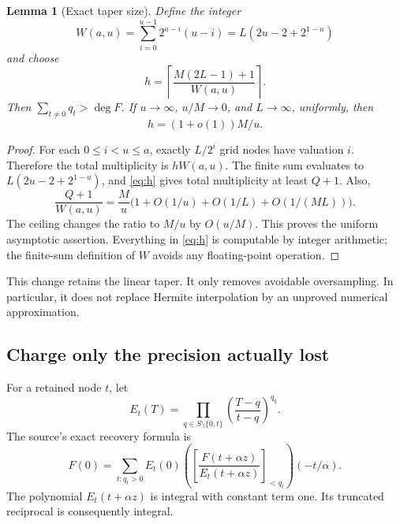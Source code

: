 \documentclass[11pt]{article}
\newtheorem{lemma}[theorem]{Lemma}
\theoremstyle{remark}
\begin{document}
\begin{lemma}[Exact taper size]
\label{lem:taper}
Define the integer
\[
 W(a,u)=\sum_{i=0}^{u-1}2^{a-i}(u-i)
       =L(2u-2+2^{1-u})
\]
and choose
\begin{equation}
 h=\left\lceil\frac{M(2L-1)+1}{W(a,u)}\right\rceil.
 \label{eq:h}
\end{equation}
Then $\sum_{t\ne0}q_t>\deg F$. If $u\to\infty$, $u/M\to0$, and $L\to\infty$, uniformly, then
\[
 h=(1+o(1))M/u.
\]
\end{lemma}
\begin{proof}
For each $0\le i<u\le a$, exactly $L/2^i$ grid nodes have valuation $i$. Therefore the total multiplicity is $hW(a,u)$. The finite sum evaluates to $L(2u-2+2^{1-u})$, and \eqref{eq:h} gives total multiplicity at least $Q+1$. Also,
\[
 \frac{Q+1}{W(a,u)}
 =\frac{M}{u}
   \bigl(1+O(1/u)+O(1/L)+O(1/(ML))\bigr).
\]
The ceiling changes the ratio to $M/u$ by $O(u/M)$. This proves the uniform asymptotic assertion. Everything in \eqref{eq:h} is computable by integer arithmetic; the finite-sum definition of $W$ avoids any floating-point operation.
\end{proof}

This change retains the linear taper. It only removes avoidable oversampling. In particular, it does not replace Hermite interpolation by an unproved numerical approximation.

\subsection{Charge only the precision actually lost}

For a retained node $t$, let
\[
 E_t(T)=\prod_{q\in S\setminus\{0,t\}}
       \left(\frac{T-q}{t-q}\right)^{q_q}.
\]
The source's exact recovery formula is
\begin{equation}
 F(0)=\sum_{t:q_t>0}E_t(0)
 \left(\left[\frac{F(t+\alpha z)}{E_t(t+\alpha z)}\right]_{<q_t}\right)
       (-t/\alpha).\label{eq:hermite}
\end{equation}
The polynomial $E_t(t+\alpha z)$ is integral with constant term one. Its truncated reciprocal is consequently integral.
\end{document}
